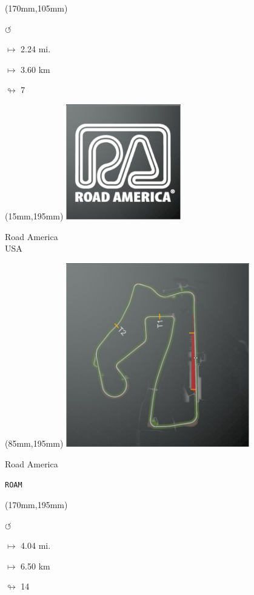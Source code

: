 \begin{textblock*}{30mm}(170mm,105mm)%
\par \Huge$\circlearrowleft$
\Large
\par$\mapsto$ 2.24 mi.
\par$\mapsto$ 3.60 km
\par$\looparrowright$ 7
\end{textblock*}
\begin{textblock*}{60mm}(15mm,195mm)%
\includegraphics[width=50mm]{LG/2015-05-20_00092.png}
\par Road America\\ USA
\end{textblock*}
\begin{textblock*}{80mm}(85mm,195mm)%
\includegraphics[width=80mm]{TR/2015-05-20_00051.png}
\centerline{Road America}
\par\hfill\tiny\tt ROAM\\
\end{textblock*}
\begin{textblock*}{30mm}(170mm,195mm)%
\par \Huge$\circlearrowleft$
\Large
\par$\mapsto$ 4.04 mi.
\par$\mapsto$ 6.50 km
\par$\looparrowright$ 14
\end{textblock*}
\null\newpage

